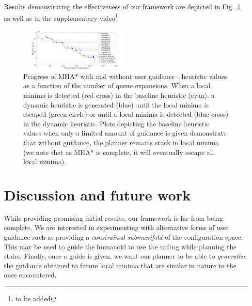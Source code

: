 \documentclass[conference]{IEEEtran}
\begin{document}
Results demonstrating the effectiveness of our framework are depicted in Fig.~\ref{fig:res}
as well as in the supplementary video\footnote{
to be added}
\begin{figure}[tb]
  \centering
  	\includegraphics[width=0.5\textwidth]{fig/h_staircase.jpg}
  	\vspace{-2mm}
  \caption{
		Progress of MHA* with and without user guidance---heuristic values as a function of the number of queue expansions.
		When a local minima is detected (red cross) in the baseline heuristic (cyan), a dynamic heuristic is generated (blue) until the local minima is escaped (green circle) or until a local minima is detected (blue cross) in the dynamic heuristic.
		Plots depicting the baseline heuristic values when only a limited amount of guidance is given demonstrate that without guidance, the planner remains stuck in local minima (we note that as MHA* is complete, it will eventually escape all local minima).
		}
\vspace{-5mm}
   	\label{fig:res}
\end{figure}

\section{Discussion and future work}
\label{sec:future}

While providing promising initial results, our framework is far from being complete.
We are interested in experimenting with alternative forms of user guidance such as providing a \emph{constrained submanifold} of the configuration space. This may be used to guide the humanoid to use the railing while planning the stairs.
Finally, once a guide is given, we want our planner to be able to \emph{generalize} the guidance obtained to future local minima that are similar in nature to the ones encountered.


%


\end{document}

